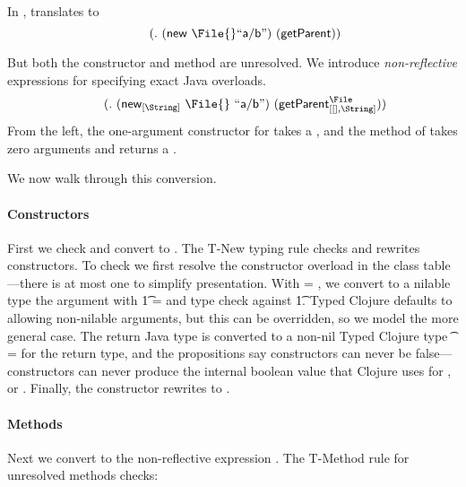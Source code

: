 In , 
translates to
\begin{equation}  \label{eq:unresolved}
  \qquad {\methodexp {\getparent{}} {\newexp {\File{}} {\makestr{a/b}}} {}}
\end{equation}

But both the constructor and method are unresolved.
We introduce \emph{non-reflective} expressions for specifying exact Java overloads.
\begin{equation} \label{eq:resolved}
\qquad {\methodstaticexp {\File} {} {\String} {\getparent{}} {\newstaticexp {\String} {\File{}} {\File{}} {\makestr{a/b}}} {}}
\end{equation}
From the left, the one-argument constructor for \File takes a \String, and the 
\getparent{} method of
\File{} takes zero arguments
and
returns a \String.

We now walk through this conversion.%

\paragraph{Constructors} First we check and convert {\newexp {\File{}} {}} to {\newstaticexp {\String} {\File{}} {\File{}} {}}.
The T-New typing rule checks and rewrites constructors.
To check
{\newexp {\File{}} {}}
we first resolve the constructor overload in the class table---there is at most one
to simplify presentation.
With  = \String,
we convert to a nilable type the argument with \t{1} = \Union{\Nil}{\String}
and type check {} against \t{1}.
Typed Clojure defaults to allowing non-nilable arguments, but this
can be overridden, so we model the more general case.
The return Java type \File is converted to a non-nil
Typed Clojure type \t{} = \File for the return type,
and the propositions say constructors can never be false---constructors
can never produce the internal boolean value that Clojure uses for \false{}, or \nil{}.
Finally, the constructor rewrites to {\newstaticexp {\String} {\File{}} {\File{}} {}}.

\paragraph{Methods} Next we convert {\methodexp {\getparent{}} {\newstaticexp {\String} {\File{}} {\File{}} {}} {}}
to the non-reflective expression
{\methodstaticexp {\File} {} {\String} {\getparent{}} {\newstaticexp {\String} {\File{}} {\File{}} {}} {}}.
The T-Method rule for unresolved methods
checks:

